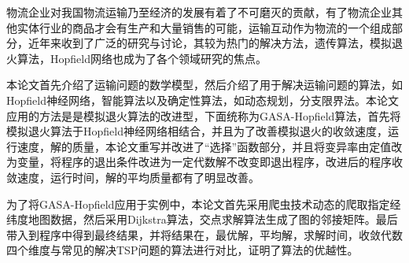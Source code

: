 
\begin{cabstract}
    物流企业对我国物流运输乃至经济的发展有着了不可磨灭的贡献，有了物流企业其他实体行业的商品才会有生产和大量销售的可能，运输互动作为物流的一个组成部分，近年来收到了广泛的研究与讨论，其较为热门的解决方法，遗传算法，模拟退火算法，Hopfield网络也成为了各个领域研究的焦点。
    \par
    本论文首先介绍了运输问题的数学模型，然后介绍了用于解决运输问题的算法，如Hopfield神经网络，智能算法以及确定性算法，如动态规划，分支限界法。本论文应用的方法是是模拟退火算法的改进型，下面统称为GASA-Hopfield算法，首先将模拟退火算法于Hopfield神经网络相结合，并且为了改善模拟退火的收敛速度，运行速度，解的质量，本论文重写并改进了“选择”函数部分，并且将变异率由定值改为变量，将程序的退出条件改进为一定代数解不改变即退出程序，改进后的程序收敛速度，运行时间，解的平均质量都有了明显改善。
    \par
    为了将GASA-Hopfield应用于实例中，本论文首先采用爬虫技术动态的爬取指定经纬度地图数据，然后采用Dijkstra算法，交点求解算法生成了图的邻接矩阵。最后带入到程序中得到最终结果，并将结果在，最优解，平均解，求解时间，收敛代数四个维度与常见的解决TSP问题的算法进行对比，证明了算法的优越性。
\end{cabstract}

